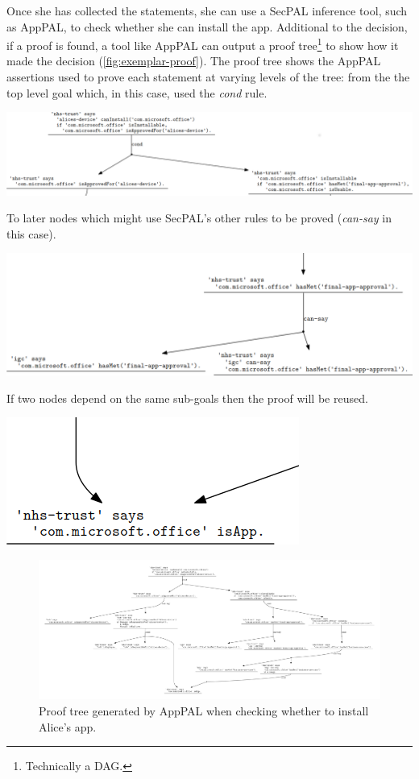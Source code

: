 \documentclass[thesis.tex]{subfiles}
\begin{document}
Once she has collected the statements, she can use a SecPAL inference tool,
such as AppPAL, to check whether she can install the app.  Additional to the
decision, if a proof is found, a tool like AppPAL can output a proof
tree\footnote{Technically a DAG.} to show how it made the decision
(\autoref{fig:exemplar-proof}).  The proof tree shows the AppPAL assertions
used to prove each statement at varying levels of the tree: from the the top
level goal which, in this case, used the \emph{cond} rule.

\begin{center}
  \includegraphics[width=0.9\linewidth]{figures/exemplar-proof-1.png}
\end{center}

To later nodes which might use SecPAL's other rules to be proved (\emph{can-say} in this case).

\begin{center}
  \includegraphics[width=0.9\linewidth]{figures/exemplar-proof-2.png}
\end{center}

If two nodes depend on the same sub-goals then the proof will be reused.

\begin{center}
  \includegraphics[width=0.3\linewidth]{figures/exemplar-proof-3.png}
\end{center}

\begin{figure}
  \centering
  \includegraphics[width=0.9\textheight, angle=90]{figures/exemplar-proof.pdf}
  \caption[Proof tree output by AppPAL]{Proof tree generated by AppPAL when checking whether to install Alice's app.}
  \label{fig:exemplar-proof}
\end{figure}
\end{document}
